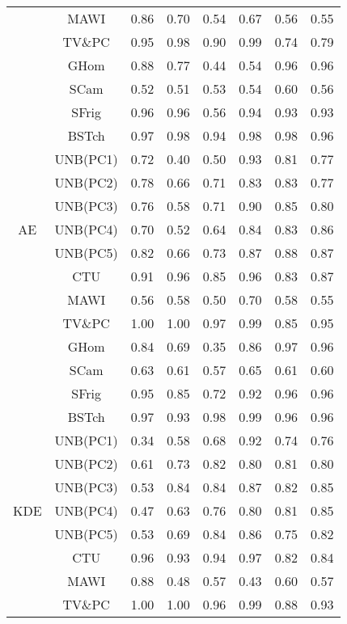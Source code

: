 \documentclass{article}
\begin{document}
\begin{tiny}
\begin{longtable}{|c|c|c|c|c|c|c|c|}
&MAWI & 0.86 & 0.70 & 0.54 & 0.67 & 0.56 & 0.55\\
\cmidrule{2-8}
&TV\&PC & 0.95 & 0.98 & 0.90 & 0.99 & 0.74 & 0.79\\ 
\cmidrule{2-8}
&GHom & 0.88 & 0.77 & 0.44 & 0.54 & 0.96 & 0.96\\ 
&SCam & 0.52 & 0.51 & 0.53 & 0.54 & 0.60 & 0.56\\ 
&SFrig & 0.96 & 0.96 & 0.56 & 0.94 & 0.93 & 0.93 \\ 
&BSTch & 0.97 & 0.98 & 0.94 & 0.98 & 0.98 & 0.96  \\ 
\midrule
\multirow{7}{*}{AE} &UNB(PC1) & 0.72 & 0.40 & 0.50 & 0.93 & 0.81 & 0.77  \\ 
&UNB(PC2) & 0.78 & 0.66 & 0.71 & 0.83 & 0.83 & 0.77  \\ 
&UNB(PC3) & 0.76 & 0.58 & 0.71 & 0.90 & 0.85 & 0.80 \\ 
&UNB(PC4) & 0.70 & 0.52 & 0.64 & 0.84 & 0.83 & 0.86 \\ 
&UNB(PC5) & 0.82 & 0.66 & 0.73 & 0.87 & 0.88 & 0.87 \\ 
\cmidrule{2-8}
&CTU & 0.91 & 0.96 & 0.85 & 0.96 & 0.83 & 0.87\\ 
\cmidrule{2-8}
&MAWI & 0.56 & 0.58 & 0.50 & 0.70 & 0.58 & 0.55\\ 
\cmidrule{2-8}
&TV\&PC & 1.00 & 1.00 & 0.97 & 0.99 & 0.85 & 0.95\\ 
\cmidrule{2-8}
&GHom & 0.84 & 0.69 & 0.35 & 0.86 & 0.97 & 0.96\\ 
&SCam & 0.63 & 0.61 & 0.57 & 0.65 & 0.61 & 0.60\\ 
&SFrig & 0.95 & 0.85 & 0.72 & 0.92 & 0.96 & 0.96 \\ 
&BSTch & 0.97 & 0.93 & 0.98 & 0.99 & 0.96 & 0.96  \\ 
\midrule
\multirow{7}{*}{KDE} &UNB(PC1) & 0.34 & 0.58 & 0.68 & 0.92 & 0.74 & 0.76  \\ 
&UNB(PC2) & 0.61 & 0.73 & 0.82 & 0.80 & 0.81 & 0.80  \\ 
&UNB(PC3) & 0.53 & 0.84 & 0.84 & 0.87 & 0.82 & 0.85 \\ 
&UNB(PC4) & 0.47 & 0.63 & 0.76 & 0.80 & 0.81 & 0.85 \\ 
&UNB(PC5) & 0.53 & 0.69 & 0.84 & 0.86 & 0.75 & 0.82 \\ 
\cmidrule{2-8}
&CTU & 0.96 & 0.93 & 0.94 & 0.97 & 0.82 & 0.84\\ 
\cmidrule{2-8}
&MAWI & 0.88 & 0.48 & 0.57 & 0.43 & 0.60 & 0.57\\ 
\cmidrule{2-8}
&TV\&PC & 1.00 & 1.00 & 0.96 & 0.99 & 0.88 & 0.93\\ 

\end{longtable}
\end{tiny}
\end{document}
